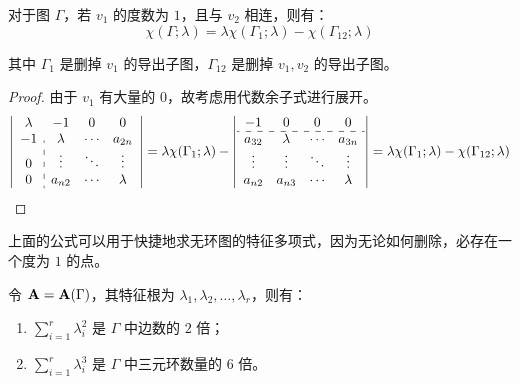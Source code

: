 \begin{corollary}[特征多项式的约化公式]
对于图 $\Gamma$，若 $v_1$ 的度数为 $1$，且与 $v_2$ 相连，则有：
\[
\chi(\Gamma ; \lambda) = \lambda \chi(\Gamma_1 ; \lambda) - \chi(\Gamma_{12} ; \lambda)
\]

其中 $\Gamma_1$ 是删掉 $v_1$ 的导出子图，$\Gamma_{12}$ 是删掉 ${v_1, v_2}$ 的导出子图。
\end{corollary}
\begin{proof}
由于 $v_1$ 有大量的 $0$，故考虑用代数余子式进行展开。
\[
\left|
\begin{array}{c:ccc}
 \lambda & -1 & 0 & 0\\
 -1 & \lambda & \cdots & a_{2n}\\
 0 & \vdots & \ddots & \vdots\\
 0 & a_{n2} & \cdots & \lambda
\end{array}
\right|
=
\lambda \chi(\Gamma_1 ; \lambda)
-
\left|
\begin{array}{cccc} 
-1 & 0 & 0 & 0\\
\hdashline 
a_{32} & \lambda & \cdots & a_{3n} \\
\vdots & \vdots & \ddots & \vdots \\
a_{n2} & a_{n3} & \cdots & \lambda \\
\end{array}
\right|
=
\lambda \chi(\Gamma_1 ; \lambda) - \chi(\Gamma_{12} ; \lambda)
\]
\end{proof}

上面的公式可以用于快捷地求无环图的特征多项式，因为无论如何删除，必存在一个度为 $1$ 的点。

\begin{proposition}[特征值幂和]
令 $\textbf A = \textbf A(\Gamma)$，其特征根为 $\lambda_1, \lambda_2, \dots, \lambda_r$，则有：
\begin{enumerate} 
\item $\sum_{i = 1}^{r} \lambda_i^{2}$ 是 $\Gamma$ 中边数的 $2$ 倍；
\item $\sum_{i = 1}^{r} \lambda_i^{3}$ 是 $\Gamma$ 中三元环数量的 $6$ 倍。
\end{enumerate} 
\end{proposition}

